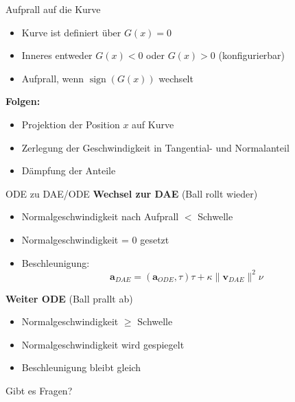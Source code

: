\documentclass[aspectratio=169]{beamer}
\begin{document}
\begin{frame}{Aufprall auf die Kurve}
	\begin{itemize}
		\item Kurve ist definiert über $G(x) = 0$
		\item Inneres entweder $G(x) < 0$ oder $G(x) > 0$ (konfigurierbar)
		\item Aufprall, wenn $\operatorname{sign}(G(x))$ wechselt
	\end{itemize}
	\pause

	\textbf{Folgen:}
	\begin{itemize}
		\item Projektion der Position $x$ auf Kurve
		\item Zerlegung der Geschwindigkeit in Tangential- und Normalanteil
		\item Dämpfung der Anteile
	\end{itemize}
\end{frame}

\begin{frame}{ODE zu DAE/ODE}
	\textbf{Wechsel zur DAE} (Ball rollt wieder)
	\begin{itemize}
		\item Normalgeschwindigkeit nach Aufprall $<$ Schwelle
		\pause
		\item Normalgeschwindigkeit = 0 gesetzt
		\item Beschleunigung:
		\[
		\mathbf{a}_{DAE} = (\mathbf{a}_{ODE}, \tau) \tau + \kappa \| \mathbf{v}_{DAE} \|^2 \nu
		\]
	\end{itemize}
	\pause
	\textbf{Weiter ODE} (Ball prallt ab)
	\begin{itemize}
		\item Normalgeschwindigkeit $\geq$ Schwelle
		\pause
		\item Normalgeschwindigkeit wird gespiegelt
		\item Beschleunigung bleibt gleich
	\end{itemize}
\end{frame}

\begin{frame}[standout]
	Gibt es Fragen?
\end{frame}
\end{document}
